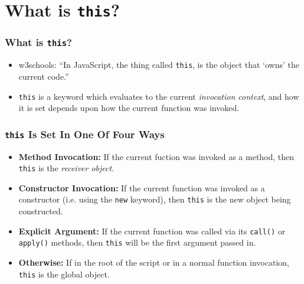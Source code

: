 \section{What is \texttt{this}?}

\begin{frame}
    \frametitle{What is \texttt{this}?}
    \begin{itemize}
        \item{w3schools: ``In JavaScript, the thing called \texttt{this}, is the
              object that `owns' the current code.''}
        \item{\texttt{this} is a keyword which evaluates to the current
              \textit{invocation context}, and how it is set depends upon how
              the current function was invoked.}
    \end{itemize}
\end{frame}

\begin{frame}
    \frametitle{\texttt{this} Is Set In One Of Four Ways}
    \begin{itemize}
        \item{\textbf{Method Invocation:} If the current fuction was invoked as
              a method, then \texttt{this} is the \textit{receiver object}.}
        \item{\textbf{Constructor Invocation:} If the current function was
              invoked as a constructor (i.e. using the \texttt{new} keyword),
              then \texttt{this} is the new object being constructed.}
        \item{\textbf{Explicit Argument:} If the current function was called via
              its \texttt{call()} or \texttt{apply()} methods, then
              \texttt{this} will be the first argument passed in.}
        \item{\textbf{Otherwise:} If in the root of the script or in a normal
              function invocation, \texttt{this} is the global object.}
    \end{itemize}
\end{frame}
